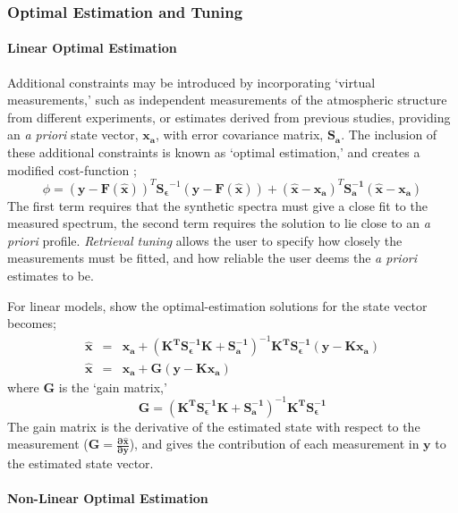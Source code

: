 \documentclass[final,5p,times,twocolumn,authoryear]{elsarticle}
\newcommand{\pderiv}[2]{\frac{\partial #1}{\partial #2}}
\begin{document}
\subsubsection{Optimal Estimation and Tuning}
\paragraph{Linear Optimal Estimation}

Additional constraints may be introduced by incorporating `virtual measurements,' such as independent measurements of the atmospheric structure from different experiments, or estimates derived from previous studies, providing an \textit{a priori} state vector, $\mathbf{x_a}$, with error covariance matrix, $\mathbf{S_a}$.  The inclusion of these additional constraints is known as `optimal estimation,' and creates a modified cost-function \citep{04irwin};
\begin{equation}
\phi=(\mathbf{y}-\mathbf{F(\hat{x})})^{T}\mathbf{S_\epsilon}^{-1}(\mathbf{y}-\mathbf{F(\hat{x})})+(\mathbf{\hat{x}}-\mathbf{x_a})^T\mathbf{S_a^{-1}}(\mathbf{\hat{x}}-\mathbf{x_a})
\end{equation}
The first term requires that the synthetic spectra must give a close fit to the measured spectrum, the second term requires the solution to lie close to an \textit{a priori} profile.  \textit{Retrieval tuning} allows the user to specify how closely the measurements must be fitted, and how reliable the user deems the \textit{a priori} estimates to be.

For linear models, \citet{00rodgers} show the optimal-estimation solutions for the state vector becomes;
\begin{eqnarray}
\widehat{\mathbf{x}} &=& \mathbf{x_a}+\left(\mathbf{K^TS_\epsilon^{-1}K+S_a^{-1}} \right)^{-1}\mathbf{K^{T}S_\epsilon^{-1}}(\mathbf{y-Kx_a}) \\
\widehat{\mathbf{x}} &=& \mathbf{x_a}+ \mathbf{G}(\mathbf{y-Kx_a})
\end{eqnarray}
where $\mathbf{G}$ is the `gain matrix,'
\begin{equation}
\mathbf{G}=\left(\mathbf{K^TS_\epsilon^{-1}K+S_a^{-1}} \right)^{-1}\mathbf{K^{T}S_\epsilon^{-1}}
\label{eq:gain_matrix}
\end{equation}
The gain matrix is the derivative of the estimated state with respect to the measurement ($\mathbf{G=\pderiv{\hat{x}}{y}}$), and gives the contribution of each measurement in $\mathbf{y}$ to the estimated state vector.

\paragraph{Non-Linear Optimal Estimation}
\end{document}
